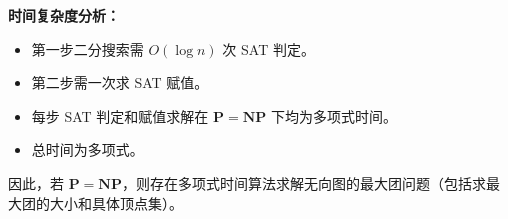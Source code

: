 \documentclass[11pt,addpoints,answers]{exam}
\begin{document}
\begin{questions}
\begin{solution}
    \textbf{时间复杂度分析：}
    \begin{itemize}
        \item 第一步二分搜索需 $O(\log n)$ 次 SAT 判定。
        \item 第二步需一次求 SAT 赋值。
        \item 每步 SAT 判定和赋值求解在 $\mathbf{P} = \mathbf{NP}$ 下均为多项式时间。
        \item 总时间为多项式。
    \end{itemize}
    
    因此，若 $\mathbf{P} = \mathbf{NP}$，则存在多项式时间算法求解无向图的最大团问题（包括求最大团的大小和具体顶点集）。
    
\end{solution}


 
\end{questions}
\end{document}
